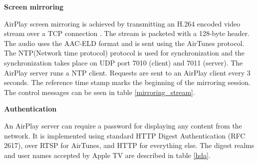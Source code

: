 \textbf{Screen mirroring}

AirPlay screen mirroring is achieved by transmitting an H.264 encoded video stream 
over a TCP connection \cite{AirPlay-spec}. The stream is packeted with a
128-byte header. The audio uses the AAC-ELD format and is sent using the AirTunes protocol. 
The NTP(Network time protocol) protocol is used for synchronization and the synchronization 
takes place on UDP port 7010 (client) and 7011 (server). The 
AirPlay server runs a NTP client. Requests are sent to an AirPlay client every 3 
seconds. The reference time stamp marks the beginning of the 
mirroring session. The control messages can be seen in table 
\ref{mirroring_stream}.

\begin{table}[htb] 
\caption{AirPlay Mirroring Control HTTP requests \label{mirroring_stream}} 
\begin{center} 
\end{center} 
\end{table} 

\textbf{Authentication}

An AirPlay server can require a password for displaying any content from the 
network. It is implemented using standard HTTP Digest Authentication (RFC 2617), 
over RTSP for AirTunes, and HTTP for everything else. The digest realms and 
user names accepted by Apple TV are described in table \ref{hda}. 

\begin{table}[htb] 
\caption{AirPlay HTTP Digest Authentication \label{hda}} 
\begin{center} 
\end{center} 
\end{table} 

